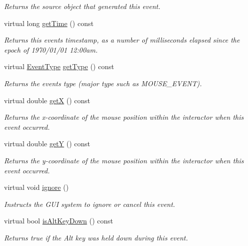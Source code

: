 \begin{DoxyCompactItemize}
\begin{DoxyCompactList}\small\item\em Returns the source object that generated this event. \end{DoxyCompactList}\item 
virtual long \mbox{\hyperlink{classsgl_1_1GEvent_a33358fd133be1650e22dbe230748b417}{get\+Time}} () const
\begin{DoxyCompactList}\small\item\em Returns this event\textquotesingle{}s timestamp, as a number of milliseconds elapsed since the epoch of 1970/01/01 12\+:00am. \end{DoxyCompactList}\item 
virtual \mbox{\hyperlink{namespacesgl_a2628ea8d12e8b2563c32f05dc7fff6fa}{Event\+Type}} \mbox{\hyperlink{classsgl_1_1GEvent_adfcd587f82f4340eaef5404f2cf6795c}{get\+Type}} () const
\begin{DoxyCompactList}\small\item\em Returns the event\textquotesingle{}s type (major type such as M\+O\+U\+S\+E\+\_\+\+E\+V\+E\+NT). \end{DoxyCompactList}\item 
virtual double \mbox{\hyperlink{classsgl_1_1GEvent_a344385751bee0720059403940d57a13e}{getX}} () const
\begin{DoxyCompactList}\small\item\em Returns the x-\/coordinate of the mouse position within the interactor when this event occurred. \end{DoxyCompactList}\item 
virtual double \mbox{\hyperlink{classsgl_1_1GEvent_aafa51c7f8f38a09febbb9ce7853f77b4}{getY}} () const
\begin{DoxyCompactList}\small\item\em Returns the y-\/coordinate of the mouse position within the interactor when this event occurred. \end{DoxyCompactList}\item 
virtual void \mbox{\hyperlink{classsgl_1_1GEvent_a1d8bbef538fb750723bcc8f3cbc77720}{ignore}} ()
\begin{DoxyCompactList}\small\item\em Instructs the G\+UI system to ignore or cancel this event. \end{DoxyCompactList}\item 
virtual bool \mbox{\hyperlink{classsgl_1_1GEvent_ac5cfd7d64f7bc3d43c4ce4326f213ab5}{is\+Alt\+Key\+Down}} () const
\begin{DoxyCompactList}\small\item\em Returns {\ttfamily true} if the Alt key was held down during this event. \end{DoxyCompactList}\item 

\end{DoxyCompactItemize}
